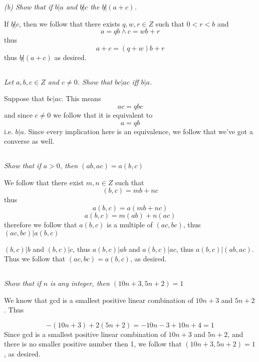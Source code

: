 \documentclass[11pt,oneside,titlepage]{book}
\begin{document}
\textit{(b) Show that if $b|a$ and $b\not|c$ the $b \not | (a + c)$.}

If $b \not | c$, then we follow that there exists $q, w, r \in Z$ such that $0 < r < b$ and 
$$a = qb \land c = wb + r$$
thus
$$a + c = (q + w)b + r$$
thus $b \not | (a + c)$ as desired.

\subsection{}

\textit{Let $a, b, c \in Z$ and $c \neq 0$. Show that $bc | ac$ iff $b | a$.}

Suppose that $bc | ac$. This means 
$$ac = qbc$$
and since $c \neq 0$ we follow that it is equivalent to 
$$a = qb$$
i.e. $b|a$. Since every implication here is an equivalence, we follow that we've got a
converse as well.

\subsection{}

\textit{Show that if $a > 0$, then $(ab, ac) = a(b, c)$}

We follow that there exist $m, n \in Z$ such that 
$$(b, c) = mb + nc$$
thus
$$a(b, c) = a(mb + nc)$$
$$a(b, c) = m(ab) + n(ac)$$
therefore we follow that $a(b, c)$ is a multiple of $(ac, bc)$, thus $(ac, bc)|a(b, c)$

$(b, c)| b$ and $(b, c)| c$, thus $a(b, c) | ab$ and $a(b, c) | ac$, thus $a(b, c) | (ab, ac)$.
Thus we follow that $(ac, bc) = a(b, c)$, as desired.

\subsection{}

\textit{Show that if $n$ is any integer, then $(10n + 3, 5n + 2)  = 1$}

We know that gcd is a smallest positive linear combination of $10 n + 3$ and $5n + 2$. Thus

$$-(10 n + 3) + 2(5n + 2) = -10n - 3 + 10n + 4 = 1$$
Since gcd is a smallest positive linear combination of $10n + 3$ and $5n + 2$, and there
is no smaller positive number then 1, we follow that $(10n + 3, 5n + 2) = 1$, as desired.

\subsection{}
\end{document}
